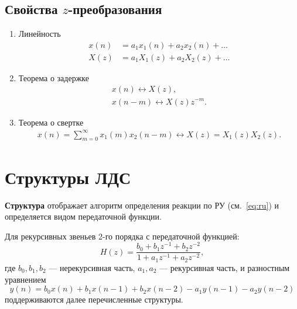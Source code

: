 \documentclass[a4paper, 14pt]{extarticle}
\begin{document}
\subsection{Свойства $z$-преобразования}
\begin{enumerate}
    \item Линейность
        \begin{equation}
            \begin{split}
                x(n) &= a_1 x_1(n) + a_2 x_2(n) + \ldots\\
                X(z) &= a_1 X_1(z) + a_2 X_2(z) + \ldots
            \end{split}
        \end{equation}
    \item Теорема о задержке
        \begin{equation}
            \begin{split}
                x(n) \leftrightarrow X(z),\\
                x(n-m) \leftrightarrow X(z) z^{-m}.
            \end{split}
        \end{equation}
    \item Теорема о свертке
        \begin{equation}
            \begin{split}
                x(n) = \sum^{\infty}_{m=0} x_1(m) x_2(n-m) \leftrightarrow X(z) = X_1(z) X_2(z).
            \end{split}
        \end{equation}
\end{enumerate}

\section{Структуры ЛДС}
\textbf{Структура} отображает алгоритм определения реакции по РУ (см.~\ref{eq:ru}) и определяется видом передаточной функции.

Для рекурсивных звеньев 2-го порядка с передаточной функцией:
\begin{equation}
    H(z) = \frac{b_0 + b_1 z^{-1} + b_2 z^{-2}}{1 + a_1 z^{-1} + a_2 z^{-2}},
\end{equation}
где $b_0, b_1, b_2$ --- нерекурсивная часть, $a_1, a_2$ --- рекурсивная часть,
и разностным уравнением
\begin{equation}
    y(n) = b_0 x(n) + b_1 x(n-1) + b_2 x(n-2) - a_1 y(n-1) - a_2 y(n-2)
\end{equation}
поддерживаются далее перечисленные структуры.
\end{document}
